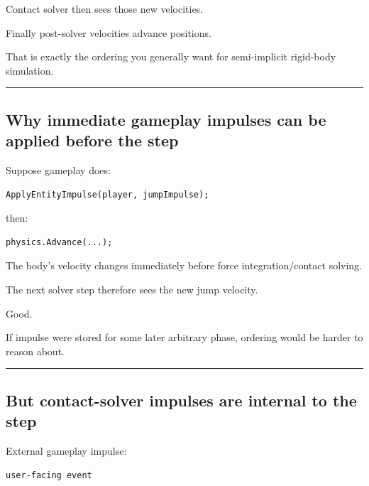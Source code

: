 Contact solver then sees those new velocities.

Finally post-solver velocities advance positions.

That is exactly the ordering you generally want for semi-implicit rigid-body simulation.

\begin{center}\rule{0.5\linewidth}{0.5pt}\end{center}

\subsection{Why immediate gameplay impulses can be applied before the step}\label{06-engine-ii-ch037-why-immediate-gameplay-impulses-can-be-applied-before-the-step}

\hypertarget{06-engine-ii-ch037-why-immediate-gameplay-impulses-can-be-applied-before-the-step}{}

Suppose gameplay does:

\begin{verbatim}
ApplyEntityImpulse(player, jumpImpulse);
\end{verbatim}

then:

\begin{verbatim}
physics.Advance(...);
\end{verbatim}

The body's velocity changes immediately before force integration/contact solving.

The next solver step therefore sees the new jump velocity.

Good.

If impulse were stored for some later arbitrary phase, ordering would be harder to reason about.

\begin{center}\rule{0.5\linewidth}{0.5pt}\end{center}

\subsection{But contact-solver impulses are internal to the step}\label{06-engine-ii-ch037-but-contact-solver-impulses-are-internal-to-the-step}

\hypertarget{06-engine-ii-ch037-but-contact-solver-impulses-are-internal-to-the-step}{}

External gameplay impulse:

\begin{verbatim}
user-facing event
\end{verbatim}


